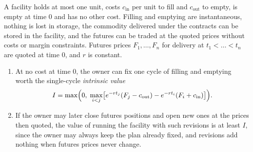 \begin{chapterrefs}
\begin{proposition}\label{prop10:intrinsic}
A facility holds at most one unit, costs $c_{\mathrm{in}}$ per unit to fill and $c_{\mathrm{out}}$ to
empty, is empty at time $0$ and has no other cost. Filling and emptying are instantaneous, nothing is lost in
storage, the commodity delivered under the contracts can be stored in the facility, and the futures can
be traded at the quoted prices without costs or margin constraints. Futures prices $F_1,\dots,F_n$ for delivery at
$t_1<\dots<t_n$ are quoted at time $0$, and $r$ is constant.
\begin{enumerate}[label=(\alph*)]
  \item At no cost at time $0$, the owner can fix one cycle of filling and emptying worth the single-cycle \emph{intrinsic value}
        \begin{equation}\label{eq10:intrinsic}
          I=\max\Bigl(0,\;\max_{i<j}\bigl[e^{-rt_j}(F_j-c_{\mathrm{out}})-e^{-rt_i}(F_i+c_{\mathrm{in}})\bigr]\Bigr).
        \end{equation}
  \item If the owner may later close futures positions and open new ones at the prices then quoted, the
        value of running the facility with such revisions is at least $I$, since the owner may always keep
        the plan already fixed, and revisions add nothing when futures prices never change.
\end{enumerate}
\end{proposition}


\end{chapterrefs}
